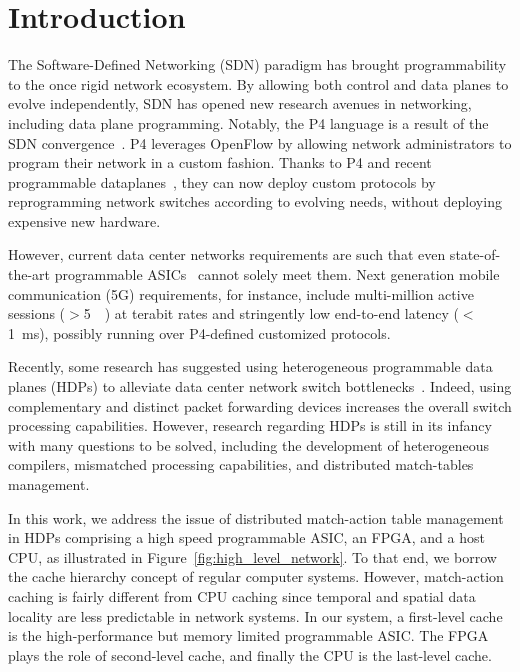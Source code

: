 \section{Introduction}\label{sec:intro}

The Software-Defined Networking (SDN) paradigm has brought programmability to the once rigid network ecosystem.
By allowing both control and data planes to evolve independently, SDN has opened new research avenues in networking, including data plane programming.
Notably, the P4 language is a result of the SDN convergence~\cite{Bosshart:14}.
P4 leverages OpenFlow by allowing network administrators to program their network in a custom fashion.
Thanks to P4 and recent programmable dataplanes~\cite{Bosshart:13}, they can now deploy custom protocols by reprogramming network switches according to evolving needs, without deploying expensive new hardware. 

However, current data center networks requirements are such that even state-of-the-art programmable ASICs~\cite{tofino:18} cannot solely meet them.
Next generation mobile communication (5G) requirements, for instance, include multi-million active sessions ($>$\SI{5}{\mega\nothing}) at terabit rates and stringently low end-to-end latency ($<$\SI{1}{\milli\second}), possibly running over P4-defined customized protocols.

Recently, some research has suggested using heterogeneous programmable data planes (HDPs) to alleviate data center network switch bottlenecks~\cite{p4eu:18}.
Indeed, using complementary and distinct packet forwarding devices increases the overall switch processing capabilities.
However, research regarding HDPs is still in its infancy with many questions to be solved, including the development of heterogeneous compilers, mismatched processing capabilities, and distributed match-tables management.

In this work, we address the issue of distributed match-action table management in HDPs comprising a high speed programmable ASIC, an FPGA, and a host CPU, as illustrated in Figure~\ref{fig:high_level_network}.
To that end, we borrow the cache hierarchy concept of regular computer systems.
However, match-action caching is fairly different from CPU caching since temporal and spatial data locality are less predictable in network systems. 
In our system, a first-level cache is the high-performance but memory limited programmable ASIC.
The FPGA plays the role of second-level cache, and finally the CPU is the last-level cache.

